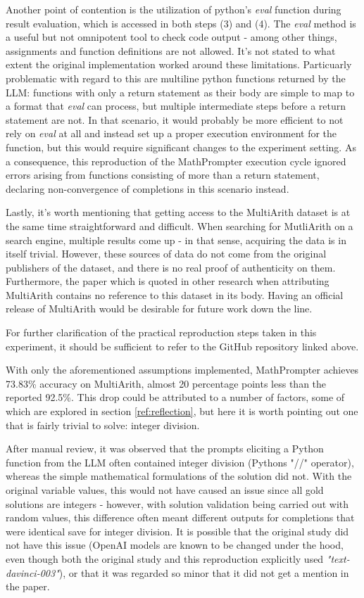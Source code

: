 Another point of contention is the utilization of python's \emph{eval} function during result evaluation, which is accessed in both steps (3) and (4). The \emph{eval} method is a useful but not omnipotent tool to check code output - among other things, assignments and function definitions are not allowed. It's not stated to what extent the original implementation worked around these limitations. Particuarly problematic with regard to this are multiline python functions returned by the LLM: functions with only a return statement as their body are simple to map to a format that \emph{eval} can process, but multiple intermediate steps before a return statement are not. In that scenario, it would probably be more efficient to not rely on \emph{eval} at all and instead set up a proper execution environment for the function, but this would require significant changes to the experiment setting. As a consequence, this reproduction of the MathPrompter execution cycle ignored errors arising from functions consisting of more than a return statement, declaring non-convergence of completions in this scenario instead.

Lastly, it's worth mentioning that getting access to the MultiArith dataset is at the same time straightforward and difficult. When searching for MutliArith on a search engine, multiple results come up - in that sense, acquiring the data is in itself trivial. However, these sources of data do not come from the original publishers of the dataset, and there is no real proof of authenticity on them. Furthermore, the paper which is quoted in other research when attributing MultiArith \citep{roy-roth-2015-solving} contains no reference to this dataset in its body. Having an official release of MultiArith would be desirable for future work down the line.

For further clarification of the practical reproduction steps taken in this experiment, it should be sufficient to refer to the GitHub repository linked above. 

With only the aforementioned assumptions implemented, MathPrompter achieves 73.83\% accuracy on MultiArith, almost 20 percentage points less than the reported 92.5\%. This drop could be attributed to a number of factors, some of which are explored in section \ref{ref:reflection}, but here it is worth pointing out one that is fairly trivial to solve: integer division.

After manual review, it was observed that the prompts eliciting a Python function from the LLM often contained integer division (Pythons "//" operator), whereas the simple mathematical formulations of the solution did not. With the original variable values, this would not have caused an issue since all gold solutions are integers - however, with solution validation being carried out with random values, this difference often meant different outputs for completions that were identical save for integer division. It is possible that the original study did not have this issue (OpenAI models are known to be changed under the hood, even though both the original study and this reproduction explicitly used \emph{"text-davinci-003"}), or that it was regarded so minor that it did not get a mention in the paper.

